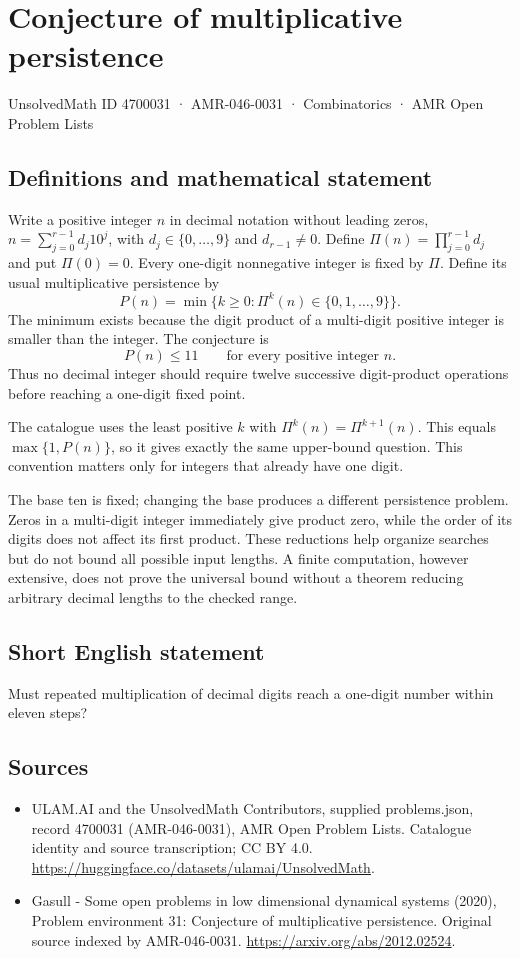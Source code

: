 \documentclass[11pt,a4paper]{article}
\begin{document}
\section*{Conjecture of multiplicative persistence}\label{4700031}
{\small UnsolvedMath ID 4700031 · AMR-046-0031 · Combinatorics · AMR Open Problem Lists}
\subsection{Definitions and mathematical statement}
Write a positive integer $n$ in decimal notation without leading zeros,
$n=\sum_{j=0}^{r-1}d_j10^j$, with $d_j\in\{0,\ldots,9\}$ and
$d_{r-1}\ne0$. Define $\Pi(n)=\prod_{j=0}^{r-1}d_j$ and put
$\Pi(0)=0$. Every one-digit nonnegative integer is fixed by $\Pi$.
Define its usual multiplicative persistence by
\[
 P(n)=\min\{k\ge0:\Pi^k(n)\in\{0,1,\ldots,9\}\}.
\]
The minimum exists because the digit product of a multi-digit positive
integer is smaller than the integer. The conjecture is
\[
 P(n)\le11\qquad\text{for every positive integer }n.
\]
Thus no decimal integer should require twelve successive digit-product
operations before reaching a one-digit fixed point.

The catalogue uses the least positive $k$ with
$\Pi^k(n)=\Pi^{k+1}(n)$. This equals $\max\{1,P(n)\}$, so it gives
exactly the same upper-bound question. This convention matters only for
integers that already have one digit.

The base ten is fixed; changing the base produces a different persistence
problem. Zeros in a multi-digit integer immediately give product zero,
while the order of its digits does not affect its first product. These
reductions help organize searches but do not bound all possible input
lengths. A finite computation, however extensive, does not prove the
universal bound without a theorem reducing arbitrary decimal lengths
to the checked range.
\subsection{Short English statement}
Must repeated multiplication of decimal digits reach a one-digit number within eleven steps?
\subsection{Sources}
\begin{itemize}
\item[S1] ULAM.AI and the UnsolvedMath Contributors, supplied problems.json, record 4700031 (AMR-046-0031), AMR Open Problem Lists. Catalogue identity and source transcription; CC BY 4.0.
\url{https://huggingface.co/datasets/ulamai/UnsolvedMath}.
\item[S2] Gasull - Some open problems in low dimensional dynamical systems (2020), Problem environment 31: Conjecture of multiplicative persistence. Original source indexed by AMR-046-0031.
\url{https://arxiv.org/abs/2012.02524}.
\end{itemize}
\end{document}
